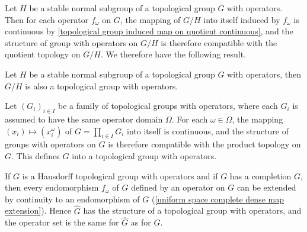 Let $H$ be a stable normal subgroup of a topological group $G$ with operators. Then for each operator $f_\omega$ on $G$, the mapping of $G/H$ into itself induced by $f_\omega$ is continuous by \cref{topological group induced map on quotient continuous}, and the structure of group with operators on $G/H$ is therefore compatible with the quotient topology on $G/H$. We therefore have the following result.
\begin{proposition}
Let $H$ be a stable normal subgroup of a topological group $G$ with operators, then $G/H$ is also a topological group with operators.
\end{proposition}
Let $(G_i)_{i\in I}$ be a family of topological groups with operators, where each $G_i$ is assumed to have the same operator domain $\Omega$. For each $\omega\in\Omega$, the mapping $(x_i)\mapsto(x_i^\omega)$ of $G=\prod_{i\in I}G_i$ into itself is continuous, and the structure of groups with operators on $G$ is therefore compatible with the product topology on $G$. This defines $G$ into a topological group with operators.\par
If $G$ is a Hausdorff topological group with operators and if $G$ has a completion $G$, then every endomorphism $f_\omega$ of $G$ defined by an operator on $G$ can be extended by continuity to an endomorphism of $G$ (\cref{uniform space complete dense map extension}). Hence $\widehat{G}$ has the structure of a topological group with operators, and the operator set is the same for $\widehat{G}$ as for $G$.
